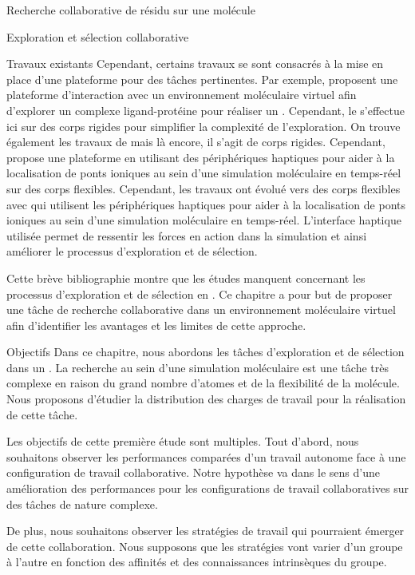 \documentclass[myfrancais,ngerman,english,frenchb]{mythesis}
\begin{document}
\begin{mychapter}{Recherche collaborative de résidu sur une molécule}
\begin{mysection}{Exploration et sélection collaborative}
\begin{mysubsection}{Travaux existants}
				Cependant, certains travaux se sont consacrés à la mise en place d'une plateforme pour des tâches pertinentes.
				Par exemple,  proposent une plateforme d'interaction avec un environnement moléculaire virtuel afin d'explorer un complexe ligand-protéine pour réaliser un .
				Cependant, le  s'effectue ici sur des corps rigides pour simplifier la complexité de l'exploration.
				On trouve également les travaux de  mais là encore, il s'agit de corps rigides.
				Cependant,  propose une plateforme en utilisant des périphériques haptiques pour aider à la localisation de ponts ioniques au sein d'une simulation moléculaire en temps-réel sur des corps flexibles.
				Cependant, les travaux ont évolué vers des corps flexibles avec  qui utilisent les périphériques haptiques pour aider à la localisation de ponts ioniques au sein d'une simulation moléculaire en temps-réel.
				L'interface haptique utilisée permet de ressentir les forces en action dans la simulation et ainsi améliorer le processus d'exploration et de sélection.

				Cette brève bibliographie montre que les études manquent concernant les processus d'exploration et de sélection en .
				Ce chapitre a pour but de proposer une tâche de recherche collaborative dans un environnement moléculaire virtuel afin d'identifier les avantages et les limites de cette approche.
			\end{mysubsection}
			\begin{mysubsection}{Objectifs}
				Dans ce chapitre, nous abordons les tâches d'exploration et de sélection dans un .
				La recherche au sein d'une simulation moléculaire est une tâche très complexe en raison du grand nombre d'atomes et de la flexibilité de la molécule.
				Nous proposons d'étudier la distribution des charges de travail pour la réalisation de cette tâche.

				Les objectifs de cette première étude sont multiples.
				Tout d'abord, nous souhaitons observer les performances comparées d'un travail autonome face à une configuration de travail collaborative.
				Notre hypothèse va dans le sens d'une amélioration des performances pour les configurations de travail collaboratives sur des tâches de nature complexe.

				De plus, nous souhaitons observer les stratégies de travail qui pourraient émerger de cette collaboration.
				Nous supposons que les stratégies vont varier d'un groupe à l'autre en fonction des affinités et des connaissances intrinsèques du groupe.


\end{mysubsection}
\end{mysection}
\end{mychapter}
\end{document}
